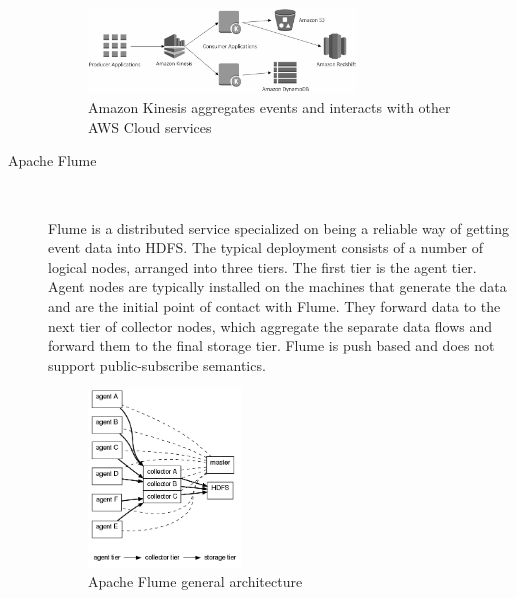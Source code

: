 \begin{description}
{   \begin{figure}[H]
     \centering
     \includegraphics[width=0.7\textwidth]{images/amazon-kinesis.png}
         \caption{Amazon Kinesis aggregates events and interacts with other AWS
         Cloud services \cite{amazonKinesis}}
        \label{fig:amazon-kinesis}
    \end{figure}
    }
    \item [Apache Flume] \hfill \\
    {Flume is a distributed service specialized on being a reliable way of
    getting event data into HDFS. The typical deployment consists
    of a number of logical nodes, arranged into three tiers. The first tier
    is the agent tier. Agent nodes are typically installed on the machines
    that generate the data and are the initial point of contact with Flume.
    They forward data to the next tier of collector nodes, which aggregate the
    separate data flows and forward them to the final storage tier. Flume is
    push based and does not support public-subscribe semantics. \cite{apacheflumeDoc}
    \begin{figure}[H]
     \centering
     \includegraphics[width=0.4\textwidth]{images/flume-architecture.png}
     \caption{Apache Flume general architecture \cite{apacheflumeDoc}} 
        \label{fig:flume-architecture}
    \end{figure}

    }
\end{description}

